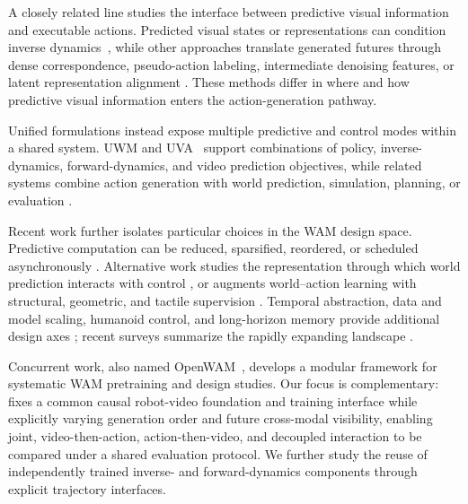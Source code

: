 A closely related line studies the interface between predictive visual
information and executable actions. Predicted visual states or representations
can condition inverse dynamics~\cite{tian2025predictive, hu2024video, li2026turningvideomodelsgeneralist}, while
other approaches translate generated futures through dense correspondence,
pseudo-action labeling, intermediate denoising features, or latent
representation alignment
\cite{ko2024learning, jang2025dreamgen, ma2026dit4dit,
vuong2026world2act}. These methods differ in where and how predictive visual
information enters the action-generation pathway.

Unified formulations instead expose multiple predictive and control modes
within a shared system. UWM and UVA~\cite{zhu2025unified, li2503unified}
support combinations of policy, inverse-dynamics, forward-dynamics, and video
prediction objectives, while related systems combine action generation with
world prediction, simulation, planning, or evaluation
\cite{cen2025worldvla, kim2026cosmos, sun2026riemann, bi2026motus2,
guo2026unified}.

Recent work further isolates particular choices in the WAM design space.
Predictive computation can be reduced, sparsified, reordered, or scheduled
asynchronously
\cite{yuan2026fast, tang2026world, wang2026glancewam,
ye2603gigaworld, li2026light, huang2026streaming,
huang2026noisegate, pan2026selfwam}. Alternative work studies the
representation through which world prediction interacts with control
\cite{liu2026oa, wang2026repwam, qiu2026making, zhao2026sg,
shen2026ld4wam, you2026affordancewam, jiang2026rethinking}, or augments
world--action learning with structural, geometric, and tactile supervision
\cite{zheng2026gift, gonzalez2026spatially, ma2026tacpac}. Temporal
abstraction, data and model scaling, humanoid control, and long-horizon memory
provide additional design axes
\cite{li2026wall, liu2026ge, zheng2026motionwam, zhao2026memory};
recent surveys summarize the rapidly expanding landscape
\cite{wang2026world, lu2026world}.

Concurrent work, also named OpenWAM~\cite{wang2026openwam}, develops a modular
framework for systematic WAM pretraining and design studies. Our focus is
complementary: \ours fixes a common causal robot-video foundation and training
interface while explicitly varying generation order and future cross-modal
visibility, enabling joint, video-then-action, action-then-video, and decoupled
interaction to be compared under a shared evaluation protocol. We further study
the reuse of independently trained inverse- and forward-dynamics components
through explicit trajectory interfaces.

